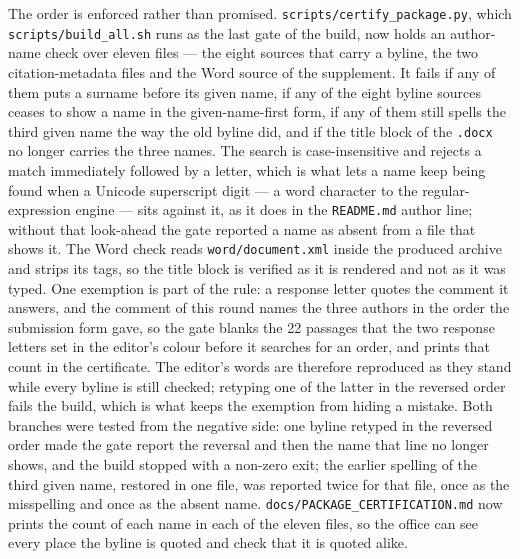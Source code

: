 \documentclass[11pt,a4paper]{article}
\begin{document}
The order is enforced rather than promised.
\texttt{scripts/}\hspace{0pt}\texttt{certify\_package.py}, which
\texttt{scripts/}\hspace{0pt}\texttt{build\_all.sh} runs as the last gate of the build, now
holds an author-name check over eleven files --- the eight sources that carry a byline, the
two citation-metadata files and the Word source of the supplement. It fails if any of them
puts a surname before its given name, if any of the eight byline sources ceases to show a
name in the given-name-first form, if any of them still spells the third given name the way
the old byline did, and if the title block of the \texttt{.docx} no longer carries the three
names. The search is case-insensitive and rejects a match immediately followed by a letter,
which is what lets a name keep being found when a Unicode superscript digit --- a word
character to the regular-expression engine --- sits against it, as it does in the
\texttt{README.md} author line; without that look-ahead the gate reported a name as absent
from a file that shows it. The Word check reads \texttt{word/document.xml} inside the
produced archive and strips its tags, so the title block is verified as it is rendered and
not as it was typed. One exemption is part of the rule: a response letter quotes the
comment it answers, and the comment of this round names the three authors in the order the
submission form gave, so the gate blanks the 22 passages that the two response letters set
in the editor's colour before it searches for an order, and prints that count in the
certificate. The editor's words are therefore reproduced as they stand while every byline
is still checked; retyping one of the latter in the reversed order fails the build, which
is what keeps the exemption from hiding a mistake. Both branches were tested from the
negative side: one byline retyped
in the reversed order made the gate report the reversal and then the name that line no
longer shows, and the build stopped with a non-zero exit; the earlier spelling of the third
given name, restored in one file, was reported twice for that file, once as the misspelling
and once as the absent name.
\texttt{docs/}\hspace{0pt}\texttt{PACKAGE\_CERTIFICATION.md} now prints the
count of each name in each of the eleven files, so the office can see every place the byline
is quoted and check that it is quoted alike.
\end{document}
